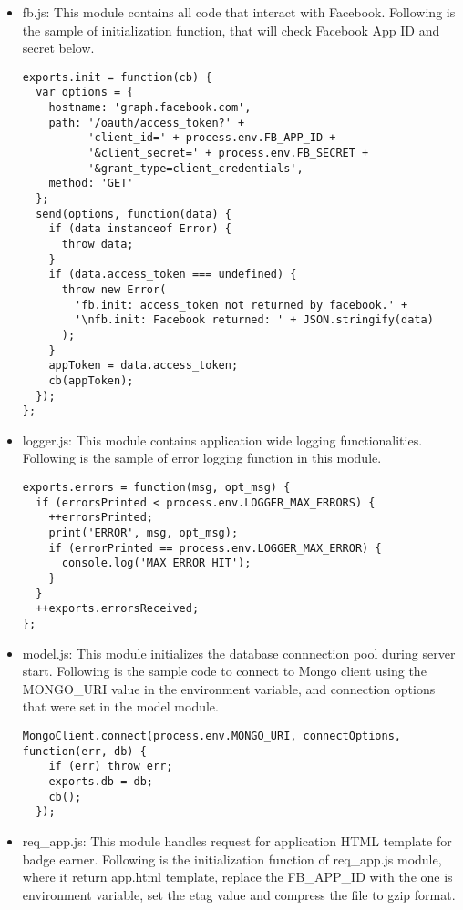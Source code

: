 \begin{itemize}
\item fb.js: This module contains all code that interact with Facebook. Following is the sample of initialization function, that will check Facebook App ID and secret below.
\begin{lstlisting}
exports.init = function(cb) {  
  var options = {
    hostname: 'graph.facebook.com',
    path: '/oauth/access_token?' + 
          'client_id=' + process.env.FB_APP_ID +
          '&client_secret=' + process.env.FB_SECRET +
          '&grant_type=client_credentials',
    method: 'GET'
  };
  send(options, function(data) {
    if (data instanceof Error) {
      throw data;
    }
    if (data.access_token === undefined) {
      throw new Error(
        'fb.init: access_token not returned by facebook.' +
        '\nfb.init: Facebook returned: ' + JSON.stringify(data)
      );
    }
    appToken = data.access_token;
    cb(appToken);
  });
};
\end{lstlisting} 


\item logger.js: This module contains application wide logging functionalities. Following is the sample of error logging function in this module.
\begin{lstlisting} 
exports.errors = function(msg, opt_msg) {
  if (errorsPrinted < process.env.LOGGER_MAX_ERRORS) {
    ++errorsPrinted;
    print('ERROR', msg, opt_msg);
    if (errorPrinted == process.env.LOGGER_MAX_ERROR) {
      console.log('MAX ERROR HIT');
    }
  }
  ++exports.errorsReceived;
};
\end{lstlisting} 

\item model.js: This module initializes the database connnection pool during server start. Following is the sample code to connect to Mongo client using the MONGO{\_}URI value in the environment variable, and connection options that were set in the model module.
\begin{lstlisting} 
MongoClient.connect(process.env.MONGO_URI, connectOptions, function(err, db) {
    if (err) throw err;
    exports.db = db;
    cb();
  }); 
\end{lstlisting} 

\item req{\_}app.js: This module handles request for application HTML template for badge earner. Following is the initialization function of req{\_}app.js module, where it return app.html template, replace the FB{\_}APP{\_}ID with the one is environment variable, set the etag value and compress the file to gzip format.


\end{itemize}

